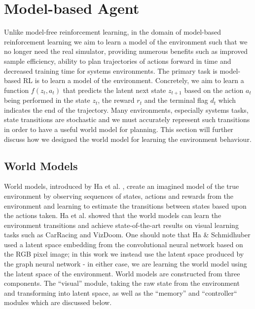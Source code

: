 \section{Model-based Agent}

Unlike model-free reinforcement learning, in the domain of model-based reinforcement learning we aim to learn a model of the environment such that we no longer need the real simulator, providing numerous benefits such as improved sample efficiency, ability to plan trajectories of actions forward in time and decreased training time for systems environments. The primary task is model-based RL is to learn a model of the environment. Concretely, we aim to learn a function $f(z_t, a_t)$ that predicts the latent next state $z_{t+1}$ based on the action $a_t$ being performed in the state $z_t$, the reward $r_t$ and the terminal flag $d_t$ which indicates the end of the trajectory. Many environments, especially systems tasks, state transitions are stochastic and we must accurately represent such transitions in order to have a useful world model for planning. This section will further discuss how we designed the world model for learning the environment behaviour.

\subsection{World Models}
World models, introduced by Ha et al. \cite{ha2018worldmodels}, create an imagined model of the true environment by observing sequences of states, actions and rewards from the environment and learning to estimate the transitions between states based upon the actions taken. Ha et al. showed that the world models can learn the environment transitions and achieve state-of-the-art results on visual learning tasks such as CarRacing and VizDoom. One should note that Ha \& Schmidhuber used  a latent space embedding from the convolutional neural network based on the RGB pixel image; in this work we instead use the latent space produced by the graph neural network - in either case, we are learning the world model using the latent space of the environment. World models are constructed from three components. The ``visual'' module, taking the raw state from the environment and transforming into latent space, as well as the ``memory''  and ``controller`` modules which are discussed below.

